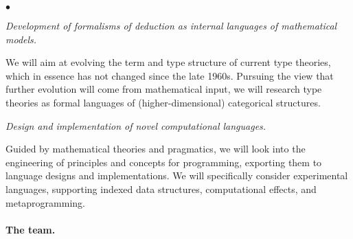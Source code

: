 \documentclass[11pt,twocolumn]{article}
\newenvironment{myitemize}
  {\begin{list}{$\bullet$}
  {\setlength{\topsep}{1pt}
   \setlength{\partopsep}{1pt}
   \setlength{\itemsep}{0pt}
   \setlength{\parsep}{0pt}
   \setlength{\leftmargin}{1em}
   \setlength{\labelwidth}{.5em}}}
  {\end{list}}
\begin{document}
\begin{myitemize}
\item[{\bfseries 3\enspace Calculi:}]\mbox{}\enspace\thinspace
  \emph{Development of formalisms of deduction as internal languages of
    mathematical models.}
  
  \vspace*{1mm}
  We will aim at evolving the term and type structure of current type
  theories, which in essence has not changed since the late 1960s.  Pursuing
  the view that further evolution will come from mathematical input, we will
  research type theories as formal languages of (higher-dimensional)
  categorical structures.  
  \vspace*{1mm}

\item[{\bfseries 4\enspace Programming:}]\mbox{}\enspace\thinspace
  \emph{Design and implementation of novel computational languages.}

  \vspace*{1mm}
  Guided by mathematical theories and pragmatics, we will look into the
  engineering of principles and concepts for programming, exporting them to
  language designs and implementations.  We will specifically consider
  experimental languages, supporting indexed data structures, computational
  effects, and metaprogramming.  
\end{myitemize}

\paragraph{The team.}
\end{document}
